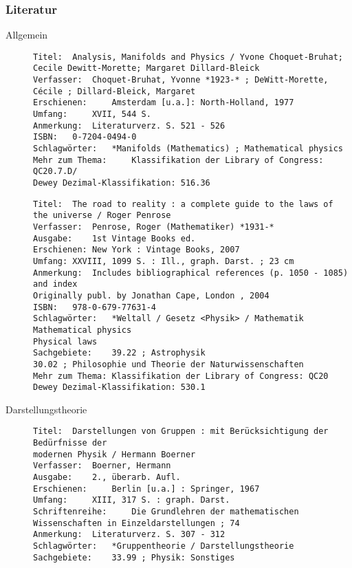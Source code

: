 \documentclass[twoside,a4paper]{scrartcl}
\renewcommand{\1}{\mathds{1}}
\begin{document}
\subsubsection*{Literatur}
\begin{description}
 \item[Allgemein]
\begin{tiny}
\begin{verbatim}
Titel: 	Analysis, Manifolds and Physics / Yvone Choquet-Bruhat; Cecile Dewitt-Morette; Margaret Dillard-Bleick
Verfasser: 	Choquet-Bruhat, Yvonne *1923-* ; DeWitt-Morette, Cécile ; Dillard-Bleick, Margaret
Erschienen: 	Amsterdam [u.a.]: North-Holland, 1977
Umfang: 	XVII, 544 S.
Anmerkung: 	Literaturverz. S. 521 - 526
ISBN: 	0-7204-0494-0
Schlagwörter: 	*Manifolds (Mathematics) ; Mathematical physics
Mehr zum Thema: 	Klassifikation der Library of Congress: QC20.7.D/
Dewey Dezimal-Klassifikation: 516.36
\end{verbatim}
\end{tiny}

\begin{tiny}
\begin{verbatim}
Titel:	The road to reality : a complete guide to the laws of the universe / Roger Penrose
Verfasser:	Penrose, Roger (Mathematiker) *1931-*
Ausgabe:	1st Vintage Books ed.
Erschienen:	New York : Vintage Books, 2007
Umfang:	XXVIII, 1099 S. : Ill., graph. Darst. ; 23 cm
Anmerkung:	Includes bibliographical references (p. 1050 - 1085) and index
Originally publ. by Jonathan Cape, London , 2004
ISBN:	978-0-679-77631-4
Schlagwörter:	*Weltall / Gesetz <Physik> / Mathematik 
Mathematical physics
Physical laws
Sachgebiete:	39.22 ; Astrophysik
30.02 ; Philosophie und Theorie der Naturwissenschaften
Mehr zum Thema:	Klassifikation der Library of Congress: QC20
Dewey Dezimal-Klassifikation: 530.1
\end{verbatim}
\end{tiny} 
\item[Darstellungstheorie]
\begin{tiny}
\begin{verbatim}
Titel: 	Darstellungen von Gruppen : mit Berücksichtigung der Bedürfnisse der 
modernen Physik / Hermann Boerner
Verfasser: 	Boerner, Hermann
Ausgabe: 	2., überarb. Aufl.
Erschienen: 	Berlin [u.a.] : Springer, 1967
Umfang: 	XIII, 317 S. : graph. Darst.
Schriftenreihe: 	Die Grundlehren der mathematischen Wissenschaften in Einzeldarstellungen ; 74
Anmerkung: 	Literaturverz. S. 307 - 312
Schlagwörter: 	*Gruppentheorie / Darstellungstheorie
Sachgebiete: 	33.99 ; Physik: Sonstiges
\end{verbatim}
\end{tiny}




\end{description}
\end{document}
